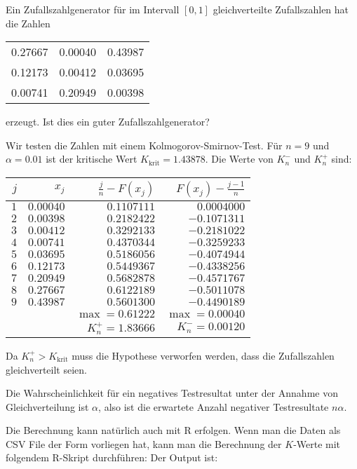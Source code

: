Ein Zufallszahlgenerator für im Intervall $[0,1]$ gleichverteilte
Zufallszahlen hat die Zahlen
\begin{center}
\begin{tabular}{ccc}
0.27667& 0.00040& 0.43987\\
0.12173& 0.00412& 0.03695\\
0.00741& 0.20949& 0.00398
\end{tabular}
\end{center}
erzeugt.
Ist dies ein guter Zufallszahlgenerator?


\begin{loesung}
Wir testen die Zahlen mit einem Kolmogorov-Smirnov-Test.
Für $n=9$ und $\alpha=0.01$ ist der kritische Wert
$K_{\text{krit}}=1.43878$. Die Werte von
$K_n^-$ und $K_n^+$ sind:
\begin{center}
\begin{tabular}{|rrrr|}
\hline
$j$&$x_j$&$\frac{j}n-F(x_j)$&$F(x_j)-\frac{j-1}n$\\
\hline
$1$&$0.00040$&$0.1107111$&$ 0.0004000$\\
$2$&$0.00398$&$0.2182422$&$-0.1071311$\\
$3$&$0.00412$&$0.3292133$&$-0.2181022$\\
$4$&$0.00741$&$0.4370344$&$-0.3259233$\\
$5$&$0.03695$&$0.5186056$&$-0.4074944$\\
$6$&$0.12173$&$0.5449367$&$-0.4338256$\\
$7$&$0.20949$&$0.5682878$&$-0.4571767$\\
$8$&$0.27667$&$0.6122189$&$-0.5011078$\\
$9$&$0.43987$&$0.5601300$&$-0.4490189$\\
\hline
&&$\operatorname{max}=0.61222$&$\operatorname{max}= 0.00040$\\
&&$K_n^+=1.83666$&$K_n^-= 0.00120$\\
\hline
\end{tabular}
\end{center}
Da $K_n^+>K_{\text{krit}}$ muss die Hypothese verworfen werden, dass
die Zufallszahlen gleichverteilt seien.
\item Die Wahrscheinlichkeit für ein negatives Testresultat unter der
Annahme von Gleichverteilung ist $\alpha$, also ist die erwartete Anzahl
negativer Testresultate $n\alpha$.

Die Berechnung kann natürlich auch mit R erfolgen. Wenn man die Daten
als CSV File der Form
vorliegen hat, kann man die Berechnung der $K$-Werte mit folgendem
R-Skript durchführen:
Der Output ist:
\end{loesung}

